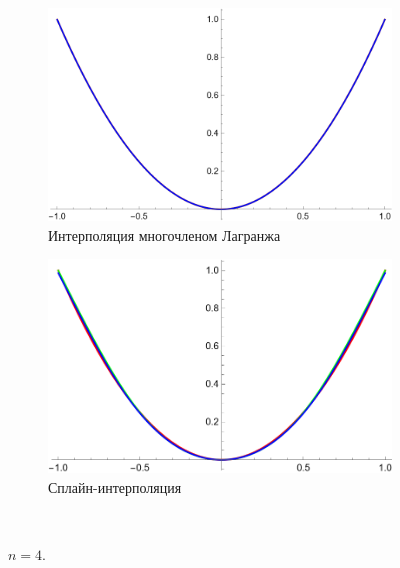 \documentclass[12pt, a4paper]{article}
\begin{document}
	
	\begin{figure}[H]
		\centering
		\begin{subfigure}{0.4\textwidth}
			\includegraphics[width=\textwidth]{1_l4}
			\caption{Интерполяция многочленом Лагранжа}
		\end{subfigure}
		\hfill
		\begin{subfigure}{0.4\textwidth}
			\includegraphics[width=\textwidth]{1_s4}
			\caption{Сплайн-интерполяция}
		\end{subfigure}
		\hfill
		\\[0.5cm]
		\caption{$n = 4$.}
	\end{figure}
	
\end{document}
